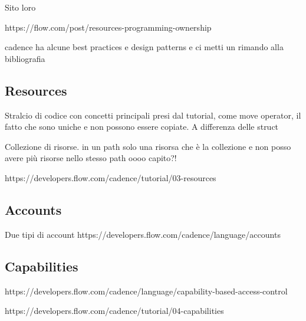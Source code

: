 Sito loro

https://flow.com/post/resources-programming-ownership

cadence ha alcune best practices e design patterns e ci metti un rimando alla bibliografia
\subsection{Resources}
Stralcio di codice con concetti principali presi dal tutorial, come move operator, il fatto che sono uniche e non possono essere copiate. A differenza delle struct 

Collezione di risorse. in un path solo una risorsa che è la collezione e non posso avere più risorse nello stesso path oooo capito?!

https://developers.flow.com/cadence/tutorial/03-resources

\subsection{Accounts}
Due tipi di account
https://developers.flow.com/cadence/language/accounts

\subsection{Capabilities}
https://developers.flow.com/cadence/language/capability-based-access-control

https://developers.flow.com/cadence/tutorial/04-capabilities